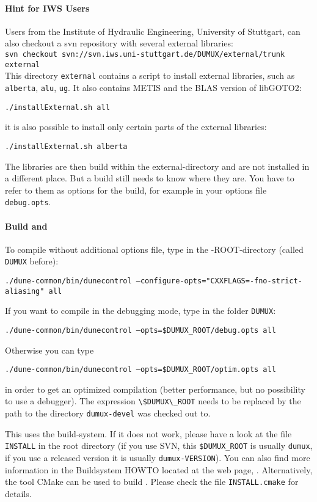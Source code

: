 \paragraph{Hint for IWS Users} Users from the Institute of Hydraulic Engineering, University of Stuttgart,
can also checkout a svn repository with several external libraries: \\

\texttt{svn checkout svn://svn.iws.uni-stuttgart.de/DUMUX/external/trunk external}\\

This directory \texttt{external} contains a script to install external libraries, such as 
\texttt{alberta}, \texttt{alu}, \texttt{ug}. It also contains METIS and the BLAS version of libGOTO2: 
\begin{center}
\texttt{./installExternal.sh all}
\end{center}
it is also possible to install only certain parts of the external libraries:
\begin{center}
\texttt{./installExternal.sh alberta}
\end{center}

The libraries are then build within the external-directory and are not installed in a different place. 
But a \Dune build still needs to know where they are. You have to refer to them as options for the \Dune build, for example in your options file \texttt{debug.opts}.


\paragraph{Build \Dune and \Dumux}
\label{buildIt}
To compile \Dumux without additional options file, type in the {\Dune}-ROOT-directory (called \texttt{DUMUX} before):
\begin{center}
 \texttt{./dune-common/bin/dunecontrol --configure-opts="CXXFLAGS=-fno-strict-aliasing"  all}
\end{center}

If you want to compile in the debugging mode, type in the folder \texttt{DUMUX}: 
\begin{center}
\texttt{./dune-common/bin/dunecontrol --opts=\$DUMUX\_ROOT/debug.opts all}
\end{center}

Otherwise you can type
\begin{center}
\texttt{./dune-common/bin/dunecontrol --opts=\$DUMUX\_ROOT/optim.opts all}
\end{center}
in order to get an optimized compilation (better performance, but no possibility to use a debugger). The expression \verb+\$DUMUX\_ROOT+
needs to be replaced by the path to the directory \texttt{dumux-devel} was checked out to. 

This uses the \Dune build-system. If it does not work, please have a look at the file \texttt{INSTALL} in the \Dumux root directory (if you use SVN, this \texttt{\$DUMUX\_ROOT} is usually \texttt{dumux}, 
if you use a released version it is usually \texttt{dumux-VERSION}). 
You can also find more information in the \Dune Buildsystem HOWTO located at the \Dune web page, \cite{DUNE-HP}.  
Alternatively, the tool CMake can be used to build \Dumux. Please check the file \texttt{INSTALL.cmake} for details.
